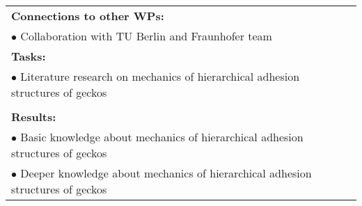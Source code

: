 \begin{table}[!h]
\begin{center}
\begin{tabular}{|p{}||p{}|p{}||p{}|}
            \multicolumn{4}{|p{.95\columnwidth}|}{\textbf{Connections to other WPs:}}\\
            \multicolumn{4}{|p{.95\columnwidth}|}{$\bullet$ Collaboration with TU Berlin and Fraunhofer team}\\
            \multicolumn{4}{|p{.95\columnwidth}|}{\textbf{Tasks:}}\\
            \multicolumn{4}{|p{.95\columnwidth}|}{$\bullet$ Literature research on mechanics of hierarchical adhesion structures of geckos}\\
            \multicolumn{4}{|p{.95\columnwidth}|}{}\\
            \multicolumn{4}{|p{.95\columnwidth}|}{\textbf{Results:}}\\
            \multicolumn{4}{|p{.95\columnwidth}|}{$\bullet$ Basic knowledge about mechanics of hierarchical adhesion structures of geckos}\\
            \multicolumn{4}{|p{.95\columnwidth}|}{$\bullet$ Deeper knowledge about mechanics of hierarchical adhesion structures of geckos}\\
            \hline
        \end{tabular}
    \end{center}
\end{table}

\clearpage

